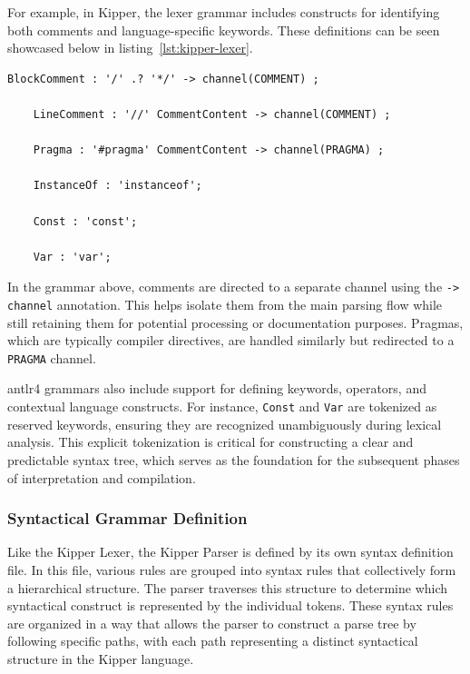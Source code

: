 For example, in Kipper, the lexer grammar includes constructs for identifying both comments and language-specific keywords. These definitions can be seen showcased below in listing~\ref{lst:kipper-lexer}.

\begin{lstlisting}[language=antlr4, caption={Sample snippet from Kipper Lexer grammar}, label={lst:kipper-lexer}]
	BlockComment : '/' .? '*/' -> channel(COMMENT) ;
	
	LineComment : '//' CommentContent -> channel(COMMENT) ;
	
	Pragma : '#pragma' CommentContent -> channel(PRAGMA) ;
	
	InstanceOf : 'instanceof';
	
	Const : 'const';
	
	Var : 'var';
\end{lstlisting}

In the grammar above, comments are directed to a separate channel using the \lstinline|-> channel| annotation. This helps isolate them from the main parsing flow while still retaining them for potential processing or documentation purposes. Pragmas, which are typically compiler directives, are handled similarly but redirected to a \lstinline|PRAGMA| channel.

\Gls{antlr4} grammars also include support for defining keywords, operators, and contextual language constructs. For instance, \lstinline|Const| and \lstinline|Var| are tokenized as reserved keywords, ensuring they are recognized unambiguously during lexical analysis. This explicit tokenization is critical for constructing a clear and predictable syntax tree, which serves as the foundation for the subsequent phases of interpretation and compilation.

\subsubsection{Syntactical Grammar Definition}
\label{sec:parser-grammar-definition}

Like the Kipper Lexer, the Kipper Parser is defined by its own syntax definition file. In this file, various rules are grouped into syntax rules that collectively form a hierarchical structure. The parser traverses this structure to determine which syntactical construct is represented by the individual tokens. These syntax rules are organized in a way that allows the parser to construct a parse tree by following specific paths, with each path representing a distinct syntactical structure in the Kipper language.

